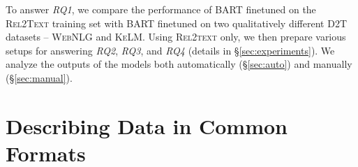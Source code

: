 To answer \textit{RQ1}, we compare the performance of BART finetuned on the \textsc{Rel2Text} training set with BART finetuned on two qualitatively different D2T datasets -- \textsc{WebNLG} and \textsc{KeLM}. Using \textsc{Rel2text} only, we then prepare various setups for answering \textit{RQ2}, \textit{RQ3}, and \textit{RQ4} (details in §\ref{sec:experiments}). We analyze the outputs of the models  both automatically (§\ref{sec:auto}) and manually (§\ref{sec:manual}).





\section{Describing Data in Common Formats}
\label{sec:quintd}